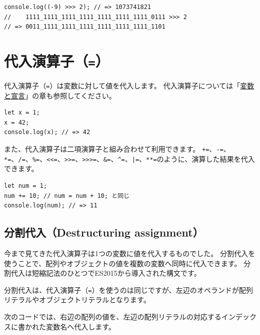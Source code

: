 \begin{lstlisting}
console.log((-9) >>> 2); // => 1073741821
//    1111_1111_1111_1111_1111_1111_1111_0111 >>> 2
// => 0011_1111_1111_1111_1111_1111_1111_1101
\end{lstlisting}
\vspace{-3mm}
\hypertarget{assignment-operator}{%
\section{\texorpdfstring{代入演算子（\texttt{=}）}{代入演算子（=）}}\label{assignment-operator}}

代入演算子（\texttt{=}）は変数に対して値を代入します。
代入演算子については「\hyperlink{variable-and-declaration}{変数と宣言}」の章も参照してください。

\begin{lstlisting}
let x = 1;
x = 42;
console.log(x); // => 42
\end{lstlisting}

また、代入演算子は二項演算子と組み合わせて利用できます。
\lstinline{+=}、\lstinline{-=}、\lstinline{*=}、\lstinline{/=}、\lstinline{%=}、\lstinline{<<=}、\lstinline{>>=}、\lstinline{>>>=}、\lstinline{&=}、\lstinline{^=}、\lstinline{|=}、\lstinline{**=}のように、演算した結果を代入できます。

\begin{lstlisting}
let num = 1;
num += 10; // num = num + 10; と同じ
console.log(num); // => 11
\end{lstlisting}

\hypertarget{destructuring-assignment}{%
\subsection[分割代入（Destructuring
assignment）]{分割代入（Destructuring
assignment）\protect{}}\label{destructuring-assignment}}

今まで見てきた代入演算子は1つの変数に値を代入するものでした。
分割代入を使うことで、配列やオブジェクトの値を複数の変数へ同時に代入できます。
分割代入は短縮記法のひとつでES2015から導入された構文です。

分割代入は、代入演算子（\texttt{=}）を使うのは同じですが、左辺のオペランドが配列リテラルやオブジェクトリテラルとなります。

次のコードでは、右辺の配列の値を、左辺の配列リテラルの対応するインデックスに書かれた変数名へ代入します。

